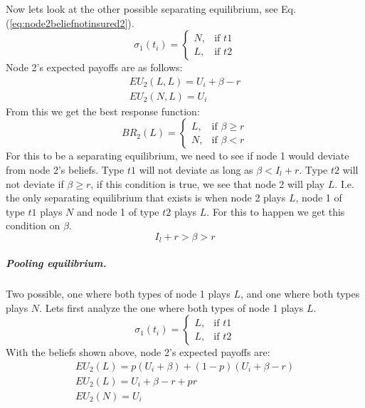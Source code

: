 Now lets look at the other possible separating equilibrium, see Eq.(\ref{eq:node2beliefnotinsured2}).
\begin{equation}
    \sigma_{1}(t_{i})= 
\begin{cases}
   N,& \text{if } t1\\
   L,& \text{if } t2  
\end{cases}
\label{eq:node2beliefnotinsured2}
\end{equation}
Node 2's expected payoffs are as follows:
\begin{eqnarray}
EU_{2}(L,L)=U_{i}+\beta-r \\
EU_{2}(N,L)=U_{i}
\end{eqnarray}
From this we get the best response function:
\begin{equation}
BR_{2}(L)=
\begin{cases}
L ,& \text{if } \beta\geq r \\
N ,& \text{if } \beta<r 
\end{cases}
\end{equation}
For this to be a separating equilibrium, we need to see if node 1 would deviate from node 2's beliefs. 
Type $t1$ will not deviate as long as $\beta<I_{l}+r$. Type $t2$ will not deviate if $\beta \geq r$, if this condition is true, we see that node 2 will play $L$. I.e. the only separating equilibrium that exists is when node 2 plays $L$, node 1 of type $t1$ plays $N$ and node 1 of type $t2$ plays $L$.
For this to happen we get this condition on $\beta$. \begin{equation}
I_{l}+r>\beta>r
\label{eq:conditionseparatingequilibrium}
\end{equation}
\subparagraph{Pooling equilibrium.}
Two possible, one where both types of node 1 plays $L$, and one where both types plays $N$. Lets first analyze the one where both types of node 1 plays $L$.
\begin{equation}
    \sigma_{1}(t_{i})= 
\begin{cases}
   L,& \text{if } t1\\
   L,& \text{if } t2  
\end{cases}
\label{eq:node2beliefnotinsuredpooling}
\end{equation}
With the beliefs shown above, node 2's expected payoffs are: \begin{eqnarray}
EU_{2}(L)=p(U_{i}+\beta)+(1-p)(U_{i}+\beta-r) \nonumber \\
EU_{2}(L)=U_{i}+\beta-r+pr \\
EU_{2}(N)=U_{i}
\end{eqnarray}
